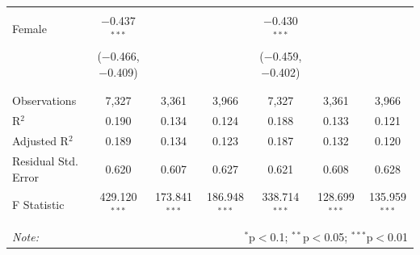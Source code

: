 \documentclass[12pt,a4paper]{article}
\numberwithin{equation}{section}
\begin{document}
\begin{landscape}
\begin{table}[!htbp]
\begin{tabular}{@{\extracolsep{5pt}}lcccccc}
			& & & & & & \\ 
			Female & $-$0.437$^{***}$ &  &  & $-$0.430$^{***}$ &  &  \\ 
			& ($-$0.466, $-$0.409) &  &  & ($-$0.459, $-$0.402) &  &  \\ 
			& & & & & & \\ 
			\hline \\[-1.8ex] 
			Observations & 7,327 & 3,361 & 3,966 & 7,327 & 3,361 & 3,966 \\ 
			R$^{2}$ & 0.190 & 0.134 & 0.124 & 0.188 & 0.133 & 0.121 \\ 
			Adjusted R$^{2}$ & 0.189 & 0.134 & 0.123 & 0.187 & 0.132 & 0.120 \\ 
			Residual Std. Error & 0.620 & 0.607 & 0.627 & 0.621 & 0.608 & 0.628 \\ 
			F Statistic & 429.120$^{***}$ & 173.841$^{***}$ & 186.948$^{***}$ & 338.714$^{***}$ & 128.699$^{***}$ & 135.959$^{***}$ \\ 
			\hline 
			\hline \\[-1.8ex] 
			\textit{Note:}  & \multicolumn{6}{r}{$^{*}$p$<$0.1; $^{**}$p$<$0.05; $^{***}$p$<$0.01} \\ 
		\end{tabular} 
	\end{table} 
	
\end{landscape}

\newpage
\end{document}
